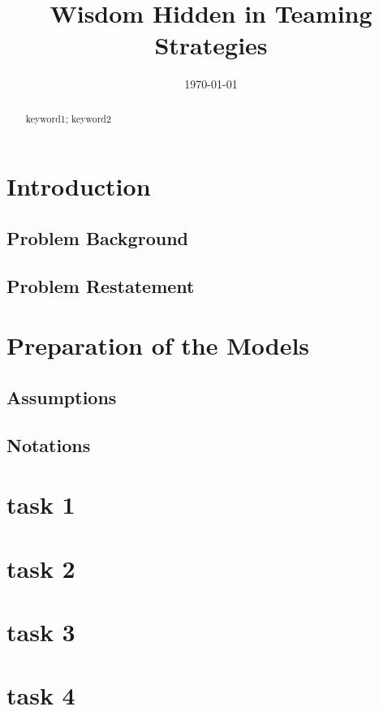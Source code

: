 \documentclass{mcmthesis}
\title{Wisdom Hidden in Teaming Strategies}
\date{\today}
\begin{document}
\begin{abstract}

\begin{keywords}
keyword1; keyword2
\end{keywords}
\end{abstract}
\maketitle
\tableofcontents
\newpage

\section{Introduction}
\subsection{Problem Background}

\subsection{Problem Restatement}

\section{Preparation of the Models}
\subsection{Assumptions}

\subsection{Notations}

\section{task 1}

\section{task 2}

\section{task 3}

\section{task 4}
\end{document}
